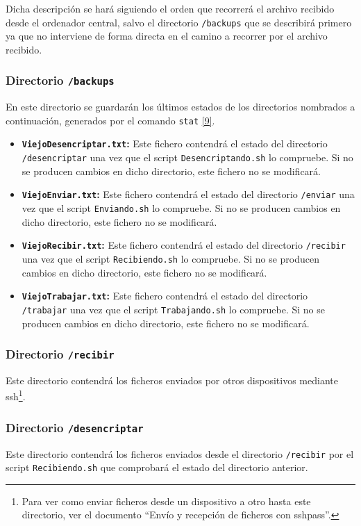 Dicha descripción se hará siguiendo el orden que recorrerá el archivo recibido desde el ordenador central, salvo el directorio \texttt{/backups} que se describirá primero ya que no interviene de forma directa en el camino a recorrer por el archivo recibido.

\subsubsection{Directorio \texttt{/backups}}
En este directorio se guardarán los últimos estados de los directorios nombrados a continuación, generados por el comando \texttt{stat} \hyperlink{9}{[9]}.
\begin{itemize}
	\item \textbf{\texttt{ViejoDesencriptar.txt}:} Este fichero contendrá el estado del directorio \texttt{/desencriptar} una vez que el script \texttt{Desencriptando.sh} lo compruebe. Si no se producen cambios en dicho directorio, este fichero no se modificará.
	\item \textbf{\texttt{ViejoEnviar.txt}:} Este fichero contendrá el estado del directorio \texttt{/enviar} una vez que el script \texttt{Enviando.sh} lo compruebe. Si no se producen cambios en dicho directorio, este fichero no se modificará.
	\item \textbf{\texttt{ViejoRecibir.txt}:} Este fichero contendrá el estado del directorio \texttt{/recibir} una vez que el script \texttt{Recibiendo.sh} lo compruebe. Si no se producen cambios en dicho directorio, este fichero no se modificará.
	\item \textbf{\texttt{ViejoTrabajar.txt}:} Este fichero contendrá el estado del directorio \texttt{/trabajar} una vez que el script \texttt{Trabajando.sh} lo compruebe. Si no se producen cambios en dicho directorio, este fichero no se modificará.
\end{itemize}

\subsubsection{Directorio \texttt{/recibir}}
Este directorio contendrá los ficheros enviados por otros dispositivos mediante ssh\footnote{Para ver como enviar ficheros desde un dispositivo a otro hasta este directorio, ver el documento ``Envío y recepción de ficheros con sshpass''.}.

\subsubsection{Directorio \texttt{/desencriptar}}
Este directorio contendrá los ficheros enviados desde el directorio \texttt{/recibir} por el script \texttt{Recibiendo.sh} que comprobará el estado del directorio anterior.

